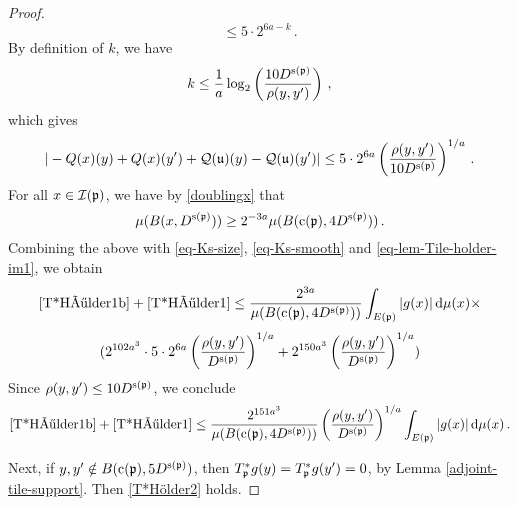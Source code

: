 {\begin{proof}
        $$
            \le 5 \cdot 2^{6a - k}\,.
        $$
        By definition of $k$, we have
        $$
            k \le \frac{1}{a} \log_2\left(\frac{10 D^{{\mathrm{s}}({\mathfrak p})}}{\rho(y,y')}\right)\,,
        $$
        which gives
        \begin{equation}
            \label{eq-lem-Tile-holder-im1}
             |-{Q}(x)(y) + {Q}(x)(y') + {\mathcal{Q}}({\mathfrak u})(y) - {\mathcal{Q}}({\mathfrak u})(y')| \le 5 \cdot 2^{6a} \left(\frac{\rho(y,y')}{10 D^{{\mathrm{s}}({\mathfrak p})}}\right)^{1/a}\,.
        \end{equation}
        For all $x \in {\mathcal{I}}({\mathfrak p})$, we have by \eqref{doublingx} that
        $$
            \mu(B(x, D^{{\mathrm{s}}({\mathfrak p})})) \ge 2^{-3a} \mu(B({\mathrm{c}}({\mathfrak p}), 4D^{{\mathrm{s}}({\mathfrak p})}))\,.
        $$
        Combining the above with \eqref{eq-Ks-size}, \eqref{eq-Ks-smooth} and \eqref{eq-lem-Tile-holder-im1},
        we obtain
        $$
            \eqref{T*Hölder1b}+\eqref{T*Hölder1} \le \frac{2^{3a}}{\mu(B({\mathrm{c}}({\mathfrak p}), 4D^{{\mathrm{s}}({\mathfrak p})}))} \int_{E({\mathfrak p})}|g(x)| \, \mathrm{d}\mu(x) \times
        $$
        $$
            (2^{102a^3} \cdot 5 \cdot 2^{6a} \left(\frac{\rho(y,y')}{ D^{{\mathrm{s}}({\mathfrak p})}}\right)^{1/a} + 2^{150a^3} \left(\frac{\rho(y,y')}{D^{{\mathrm{s}}({\mathfrak p})}}\right)^{1/a})
        $$
        Since $\rho(y,y') \le 10 D^{{\mathrm{s}}({\mathfrak p})}$, we conclude
        $$
            \eqref{T*Hölder1b}+\eqref{T*Hölder1} \le \frac{2^{151a^3}}{\mu(B({\mathrm{c}}({\mathfrak p}), 4D^{{\mathrm{s}}({\mathfrak p})}))} \left(\frac{\rho(y,y')}{D^{{\mathrm{s}}({\mathfrak p})}}\right)^{1/a} \int_{E({\mathfrak p})}|g(x)| \, \mathrm{d}\mu(x)\,.
        $$

        Next, if $y,y' \notin B({\mathrm{c}}({\mathfrak p}), 5D^{{\mathrm{s}}({\mathfrak p})})$, then $T_{{\mathfrak p}}^*g(y) = T_{{\mathfrak p}}^*g(y') = 0$, by Lemma \ref{adjoint-tile-support}. Then \eqref{T*Hölder2} holds.


\end{proof}}

